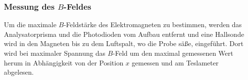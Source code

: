 \subsubsection{Messung des $B$-Feldes}
Um die maximale $B$-Feldstärke des Elektromagneten zu bestimmen, werden das Analysatorprisma und die Photodioden vom Aufbau entfernt und eine Hallsonde wird in den Magneten bis zu dem Luftspalt, wo die Probe säße, eingeführt. Dort wird bei maximaler Spannung das $B$-Feld um den maximal gemessenen Wert herum in Abhängigkeit von der Position $x$ gemessen und am Teslameter abgelesen.

\clearpage